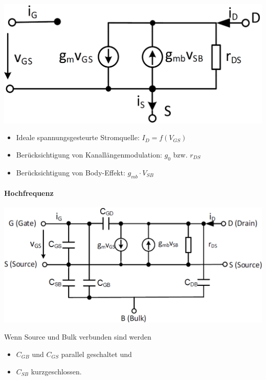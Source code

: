 \begin{minipage}[t]{0.48\columnwidth}
    \includegraphics[width=\columnwidth, align=t]{images/02_MOSFET_Pi_Ersatzschaltung.png}
\end{minipage}
\hfill
\begin{minipage}[t]{0.48\columnwidth}
    \raggedright
    \begin{itemize}
        \item Ideale spannungsgesteurte Stromquelle: $I_D = f(V_{GS})$
        \item Berücksichtigung von Kanallängenmodulation: $g_0$ bzw. $r_{DS}$
        \item Berücksichtigung von Body-Effekt: $g_{mb} \cdot V_{SB}$
    \end{itemize}
\end{minipage}


\paragraph{Hochfrequenz}
\label{Hochfrequenz}

\begin{minipage}[t]{0.48\columnwidth}
    \includegraphics[width=\columnwidth, align=t]{images/02_MOSFET_Kleinsignalersatzschaltung_hochfrequent.png}
\end{minipage}
\hfill
\begin{minipage}[t]{0.48\columnwidth}
    \raggedright
    Wenn Source und Bulk verbunden sind werden
    \begin{itemize}
        \item $C_{GB}$ und $C_{GS}$ parallel geschaltet und
        \item $C_{SB}$ kurzgeschlossen.
    \end{itemize}
\end{minipage}


